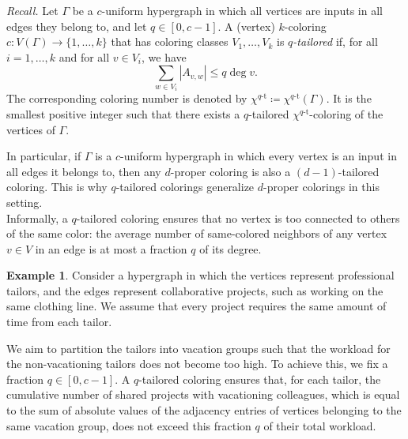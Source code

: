 \documentclass{article}
\theoremstyle{plain}
\theoremstyle{definition}
\newtheorem{example}[theorem]{Example}
\theoremstyle{remark}
\begin{document}
   \emph{Recall.} Let $\Gamma$ be a $c$-uniform hypergraph in which all vertices are inputs in all edges they belong to, and let $q\in [0,c-1]$. A (vertex) $k$-coloring $c\colon V(\Gamma)\to \{1,\ldots,k\}$ that has coloring classes $V_1,\ldots,V_k$ is \emph{$q$-tailored} if, for all $i=1,\ldots,k$ and for all $v\in V_i$, we have
    \begin{equation*}
        \sum_{w\in V_i}|A_{v,w}|\leq q \deg v.
    \end{equation*}
    The corresponding coloring number is denoted by $\chi^{q\text{-t}}\coloneqq \chi^{q\text{-t}}(\Gamma)$. It is the smallest positive integer such that there exists a $q$-tailored $\chi^{q\text{-t}}$-coloring of the vertices of $\Gamma$.\newline 


In particular, if $\Gamma$ is a $c$-uniform hypergraph in which every vertex is an input in all edges it belongs to, then any $d$-proper coloring is also a $(d-1)$-tailored coloring. This is why $q$-tailored colorings generalize $d$-proper colorings in this setting.\\

Informally, a $q$-tailored coloring ensures that no vertex is too connected to others of the same color: the average number of same-colored neighbors of any vertex $v\in V$ in an edge is at most a fraction $q$ of its degree.




\begin{example}\label{ex:q-tailored}
    Consider a hypergraph in which the vertices represent professional tailors, and the edges represent collaborative projects, such as working on the same clothing line. We assume that every project requires the same amount of time from each tailor.
    
    We aim to partition the tailors into vacation groups such that the workload for the non-vacationing tailors does not become too high. To achieve this, we fix a fraction $q\in [0,c-1]$. A $q$-tailored coloring ensures that, for each tailor, the cumulative number of shared projects with vacationing colleagues, which is equal to the sum of absolute values of the adjacency entries of vertices belonging to the same vacation group,
    does not exceed this fraction $q$ of their total workload.
\end{example}
\end{document}
